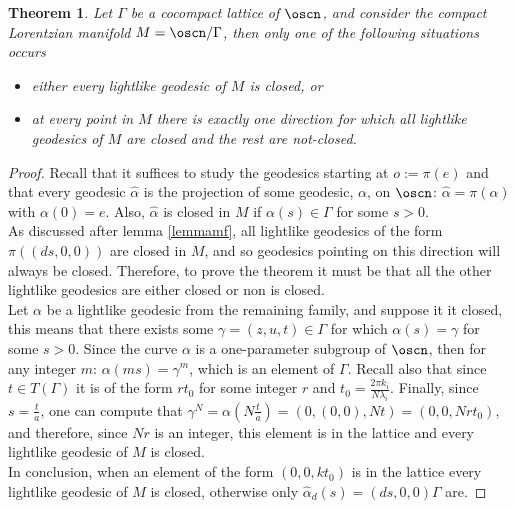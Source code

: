 \documentclass[11pt]{amsart}
\theoremstyle{plain}
\newtheorem{thm}{Theorem}[section]
\theoremstyle{definition}
\theoremstyle{remark}
\begin{document}
\begin{thm}\label{teoremaoscilador}
	Let $\Gamma$ be a cocompact lattice of $\oscn$, and consider the compact Lorentzian manifold $M=\oscn/\Gamma$, then only one of the following situations occurs
	\begin{itemize}
		\item either every  lightlike geodesic of $M$ is closed, or
		\item at every point in $M$ there is exactly one direction for which all lightlike geodesics of $M$ are closed and the rest are not-closed.
		
	\end{itemize}
	
\end{thm}

\begin{proof}
	Recall that it suffices to study the geodesics starting at $o:=\pi(e)$ and that every geodesic $\hat{\alpha}$ is the projection of some geodesic, $\alpha$, on $\oscn$: $\hat{\alpha}=\pi(\alpha)$ with $\alpha(0)=e$. Also, $\hat{\alpha}$ is closed in $M$ if $\alpha(s) \in \Gamma$ for some $s>0$.\\
	
	As discussed after lemma \ref{lemmamf}, all lightlike geodesics of the form $\pi((ds,0,0))$ are closed in $M$, and so geodesics pointing on this direction will always be closed. Therefore, to prove the theorem it must be that all the other lightlike geodesics are either closed or non is closed.\\
	
	Let $\alpha$ be a lightlike geodesic from the remaining family, and suppose it it closed, this means that there exists some $\gamma=(z,u,t) \in \Gamma$ for which $\alpha(s)=\gamma$ for some $s>0$. Since the curve $\alpha$ is a one-parameter subgroup of $\oscn$, then for any integer $m$: $\alpha(m s)=\gamma^m$, which is an element of $\Gamma$. Recall also that since $t \in T(\Gamma)$ it is of the form $r t_0$ for some integer $r$ and $t_0=\frac{2 \pi k_i}{N \lambda_i}$. Finally, since $s=\frac{t}{a}$, one can compute that $\gamma^N = \alpha(N \frac{t}{a}) = (0,(0,0),N t) = (0,0,N r t_0)$, and therefore, since $N r$ is an integer, this element is in the lattice and every lightlike geodesic of $M$ is closed.\\
	
	In conclusion, when an element of the form $(0,0,k t_0)$ is in the lattice every lightlike geodesic of $M$ is closed, otherwise only $\hat{\alpha}_d(s)=(ds,0,0)\Gamma$ are.
	
\end{proof}
\end{document}
